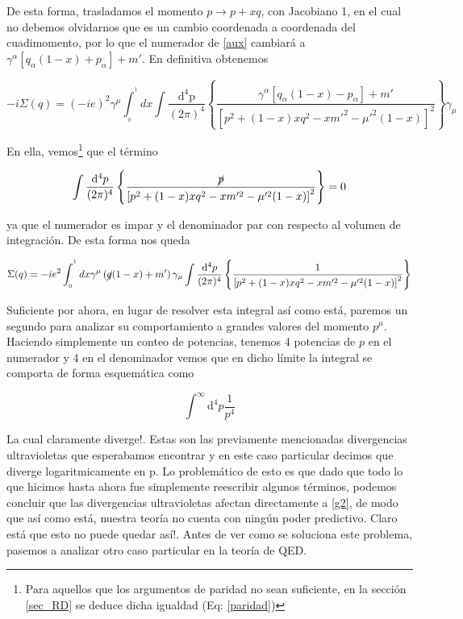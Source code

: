 \documentclass{article}
\numberwithin{equation}{section}
\begin{document}
De esta forma, trasladamos el momento $p \longrightarrow p + xq$, con Jacobiano
1, en el cual no debemos olvidarnos que es un cambio coordenada a
coordenada del cuadimomento, por lo que el numerador de \ref{aux} cambiará
a $\gamma^{\alpha}\left[q_{\alpha}(1-x)+p_{\alpha}\right]+m'$.
En definitiva obtenemos

\begin{equation}\label{aux1}
-i\Sigma(q)=(-ie)^{2}\gamma^{\mu}\int_{_{0}}^{^{1}}dx\int\frac{\mathrm{\mathrm{d^4}p}}{(2\pi)^{4}}\left\{ \frac{\gamma^{\alpha}\left[q_{\alpha}(1-x)-p_{\alpha}\right]+m'}{\left[p^{2}+(1-x)xq^{2}-xm'^{2}-\mu'^{2}(1-x)\right]^{2}}\right\} \gamma_{\mu}
\end{equation}

En ella, vemos\footnote{Para aquellos que los argumentos de paridad no sean suficiente, en la sección \ref{sec_RD} se deduce dicha igualdad (Eq: \ref{paridad})} que el término

\begin{equation}\label{key}
\int\frac{\mathrm{d^4}p}{(2\pi)^{4}}\left\{ \frac{\cancel{p} }{\left[p^{2}+(1-x)xq^{2}-xm'^{2}-\mu'^{2}(1-x)\right]^{2}}\right\}  = 0
\end{equation}

ya que el numerador es impar y el denominador par con respecto al volumen de integración. De esta forma nos queda

\begin{boxquation}
\begin{equation}\label{sigma}
\Sigma(q)=-ie^{2}\int_{_{0}}^{^{1}}dx \gamma^{\mu}\left(\cancel{q}(1-x)+m'\right) \gamma_{\mu} \int\frac{\mathrm{d^4}p}{(2\pi)^{4}}\left\{\frac{1}{\left[p^{2}+(1-x)xq^{2}-xm'^{2}-\mu'^{2}(1-x)\right]^{2}}\right\}
\end{equation}
\end{boxquation}

Suficiente por ahora, en lugar de resolver esta integral así como está, paremos un segundo para analizar su comportamiento a grandes valores del momento $ p^{\mu} $. Haciendo simplemente un conteo de potencias, tenemos 4 potencias de $ p $ en el numerador y 4 en el denominador vemos que en dicho límite la integral se comporta de forma esquemática como

\begin{equation}\label{key}
\int^{\infty} \mathrm{d^4}p \frac{1}{p^4}
\end{equation}

La cual claramente diverge!. Estas son las previamente mencionadas divergencias ultravioletas que esperabamos encontrar y en este caso particular decimos que diverge logaritmicamente en p. Lo problemático de esto es que dado que todo lo que hicimos hasta ahora fue simplemente reescribir algunos términos, podemos concluir que las divergencias ultravioletas afectan directamente a \ref{g2}, de modo que así como está, nuestra teoría no cuenta con ningún poder predictivo. Claro está que esto no puede quedar así!. Antes de ver como se soluciona este problema, pasemos a analizar otro caso particular en la teoría de QED.
\end{document}
